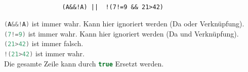 \documentclass{article}
\newcommand{\java}{\lstinline[language=Java]}
\begin{document}
        \subsection{}
            \begin{lstlisting}
                (A&&!A) ||  !(7!=9 && 21>42)
            \end{lstlisting}
            \java{(A&&!A)} ist immer wahr. Kann hier
            ignoriert werden (Da oder Verknüpfung).\\
            \java{(7!=9)} ist immer wahr. Kann hier
            ignoriert werden (Da und Verknüpfung).\\
            \java{(21>42)} ist immer falsch.\\
            \java{!(21>42)} ist immer wahr.\\
            Die gesamte Zeile kann durch \java{true}
            Ersetzt werden.
\end{document}
